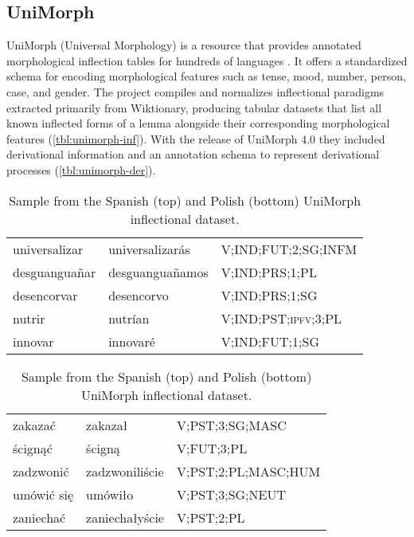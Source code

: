 \documentclass[12pt]{article}
\begin{document}
\subsection{UniMorph}

UniMorph (Universal Morphology) is a resource that provides annotated morphological inflection tables for hundreds of languages \parencite{batsuren2022UniMorph40Universal}. It offers a standardized schema for encoding morphological features such as tense, mood, number, person, case, and gender. The project compiles and normalizes inflectional paradigms extracted primarily from Wiktionary, producing tabular datasets that list all known inflected forms of a lemma alongside their corresponding morphological features (\autoref{tbl:unimorph-inf}). With the release of UniMorph 4.0 they included derivational information and an annotation schema to represent derivational processes (\autoref{tbl:unimorph-der}).

\begin{table}[htbp]
    \small
    \centering
    \begin{tabular}{p{3cm}p{3.5cm}p{4.5cm}}
        \toprule
        universalizar & universalizarás &  V;IND;FUT;2;SG;INFM \\
        desguanguañar & desguanguañamos & V;IND;PRS;1;PL \\
        desencorvar  &    desencorvo    &   V;IND;PRS;1;SG \\
        nutrir    &      nutrían  &  V;IND;PST;\textsc{ipfv};3;PL \\
        innovar    &     innovaré    &   V;IND;FUT;1;SG \\
    \end{tabular}
        \begin{tabular}{p{3cm}p{3.5cm}p{4.5cm}}
        \midrule
        zakazać        &  zakazał   &    V;PST;3;SG;MASC \\
        ścignąć         &  ścigną &           V;FUT;3;PL \\
        zadzwonić &  zadzwoniliście &  V;PST;2;PL;MASC;HUM \\
        umówić się        &  umówiło &      V;PST;3;SG;NEUT \\
        zaniechać &  zaniechałyście &           V;PST;2;PL \\
        \bottomrule
    \end{tabular}
    \caption{Sample from the Spanish (top) and Polish (bottom) UniMorph inflectional dataset.}
    \label{tbl:unimorph-inf}
\end{table}
\end{document}
